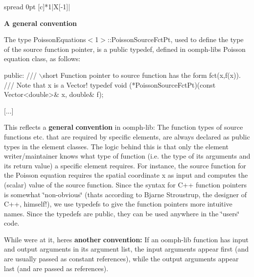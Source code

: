 \tabulinesep=1mm
\begin{longtabu} spread 0pt [c]{*{1}{|X[-1]}|}
\hline
\begin{center}{\bfseries \label{index_gen_conv}%
%
A general convention}\end{center}  The type {\ttfamily Poisson\+Equations$<$1$>$\+::\+Poisson\+Source\+Fct\+Pt}, used to define the type of the source function pointer, is a public typedef, defined in {\ttfamily oomph-\/lib\textquotesingle{}s} Poisson equation class, as follows\+:


\begin{DoxyCode}
[...]

\textcolor{keyword}{public}:
\textcolor{comment}{}
\textcolor{comment}{ /// \(\backslash\)short Function pointer to source function has the form fct(x,f(x)). }
\textcolor{comment}{ /// Note that x is a Vector! }
\textcolor{comment}{} \textcolor{keyword}{typedef} void (*PoissonSourceFctPt)(\textcolor{keyword}{const} Vector<double>& x, \textcolor{keywordtype}{double}& f);

[...]
\end{DoxyCode}


This reflects a {\bfseries general} {\bfseries convention} in {\ttfamily oomph-\/lib}\+: The function types of source functions etc. that are required by specific elements, are always declared as public types in the element classes. The logic behind this is that only the element writer/maintainer knows what type of function (i.\+e. the type of its arguments and its return value) a specific element requires. For instance, the source function for the Poisson equation requires the spatial coordinate {\ttfamily x} as input and computes the (scalar) value of the source function. Since the syntax for C++ function pointers is somewhat \char`\"{}non-\/obvious\char`\"{} (that\textquotesingle{}s according to Bjarne Stroustrup, the designer of C++, himself!), we use typedefs to give the function pointers more intuitive names. Since the typedefs are public, they can be used anywhere in the \char`\"{}user\textquotesingle{}s\char`\"{} code.

While we\textquotesingle{}re at it, here\textquotesingle{}s {\bfseries another} {\bfseries convention\+:} If an {\ttfamily oomph-\/lib} function has input and output arguments in its argument list, the input arguments appear first (and are usually passed as constant references), while the output arguments appear last (and are passed as references).   \\
\end{longtabu}




